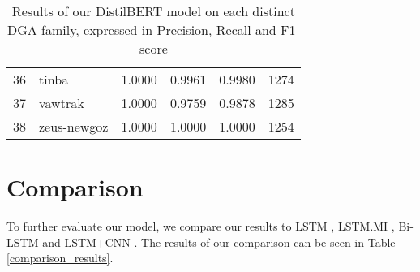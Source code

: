 \begin{table}[!htb]
{\begin{tabular}{l|l|llll}
            36 & tinba        & 1.0000    & 0.9961                     & 0.9980          & 1274    \\
            37 & vawtrak      & 1.0000    & 0.9759                     & 0.9878          & 1285    \\
            38 & zeus-newgoz  & 1.0000    & 1.0000                     & 1.0000          & 1254   
        \end{tabular}
    }
    \caption{Results of our DistilBERT model on each distinct DGA family, expressed in Precision, Recall and F1-score}
    \label{specific_results}
\end{table}



\section{Comparison}
To further evaluate our model, we compare our results to LSTM \cite{Woodbridge}, LSTM.MI \cite{TRAN20182401},  Bi-LSTM \cite{Lison} and LSTM+CNN \cite{Highnam}. The results of our comparison can be seen in Table \ref{comparison_results}. 

